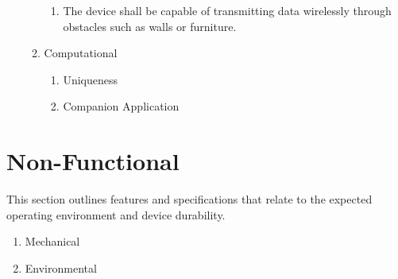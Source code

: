 \documentclass[twoside]{article}
\begin{document}
\begin{enumerate}
\begin{enumerate}
\begin{enumerate}
    \item The device shall be capable of transmitting data wirelessly through obstacles such as walls or furniture.

    \end{enumerate}

  \item Computational

    \begin{enumerate}

    \item Uniqueness
      \begin{enumerate}

      

      \end{enumerate}


    \item Companion Application
      \begin{enumerate}

      

      \end{enumerate}

    \end{enumerate}

  \end{enumerate}

\end{enumerate}



\section{Non-Functional}
This section outlines features and specifications that relate to the expected operating environment and device durability.
\begin{enumerate}



\item Mechanical
  \begin{enumerate}

    

  \end{enumerate}



\item Environmental
  \begin{enumerate}

  

  \end{enumerate}

\end{enumerate}
\end{document}
